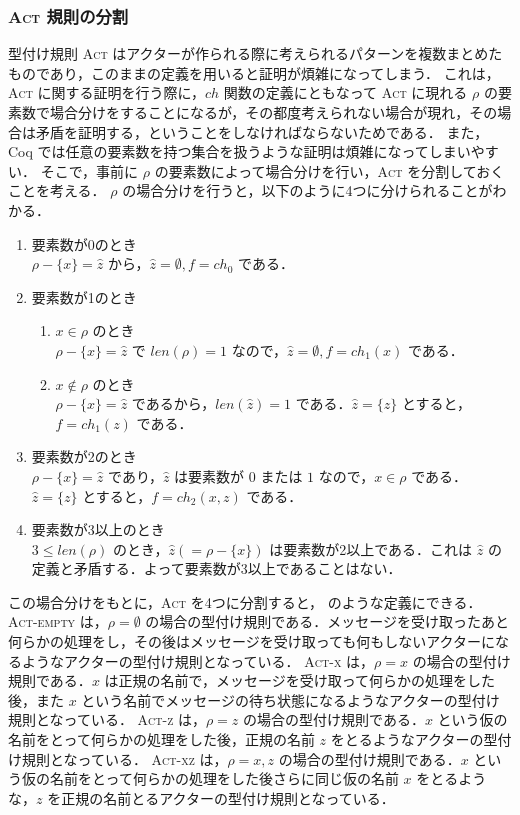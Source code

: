 \subsubsection{\textsc{Act} 規則の分割}

型付け規則 \textsc{Act} はアクターが作られる際に考えられるパターンを複数まとめたものであり，このままの定義を用いると証明が煩雑になってしまう．
これは，\textsc{Act} に関する証明を行う際に，$ch$ 関数の定義にともなって \textsc{Act} に現れる $\rho$ の要素数で場合分けをすることになるが，その都度考えられない場合が現れ，その場合は矛盾を証明する，ということをしなければならないためである．
また，Coq では任意の要素数を持つ集合を扱うような証明は煩雑になってしまいやすい．
そこで，事前に $\rho$ の要素数によって場合分けを行い，\textsc{Act} を分割しておくことを考える．
$\rho$ の場合分けを行うと，以下のように4つに分けられることがわかる．

\begin{enumerate}
  \item 要素数が0のとき \\
    $\rho - \{x\} = \hat{z}$ から，$\hat{z} = \emptyset, f = ch_0$ である．
  \item 要素数が1のとき
    \begin{enumerate}
      \item $x \in \rho$ のとき \\
        $\rho - \{x\} = \hat{z}$ で $len(\rho) = 1$ なので，$\hat{z} = \emptyset, f = ch_1(x)$ である．
      \item $x \notin \rho$ のとき \\
        $\rho - \{x\} = \hat{z}$ であるから，$len(\hat{z}) = 1$ である．$\hat{z} = \{z\}$ とすると，$f = ch_1(z)$ である．
    \end{enumerate}
  \item 要素数が2のとき \\
    $\rho - \{x\} = \hat{z}$ であり，$\hat{z}$ は要素数が $0$ または $1$ なので，$x \in \rho$ である．$\hat{z} = \{z\}$ とすると，$f = ch_2(x,z)$ である．
  \item 要素数が3以上のとき \\
    $3 \leq len(\rho)$ のとき，$\hat{z} (= \rho - \{x\})$ は要素数が2以上である．これは $\hat{z}$ の定義と矛盾する．よって要素数が3以上であることはない．
\end{enumerate}


この場合分けをもとに，\textsc{Act} を4つに分割すると， のような定義にできる．
\textsc{Act-empty} は，$\rho = \emptyset$ の場合の型付け規則である．メッセージを受け取ったあと何らかの処理をし，その後はメッセージを受け取っても何もしないアクターになるようなアクターの型付け規則となっている．
\textsc{Act-x} は，$\rho = {x}$ の場合の型付け規則である．$x$ は正規の名前で，メッセージを受け取って何らかの処理をした後，また $x$ という名前でメッセージの待ち状態になるようなアクターの型付け規則となっている．
\textsc{Act-z} は，$\rho = {z}$ の場合の型付け規則である．$x$ という仮の名前をとって何らかの処理をした後，正規の名前 $z$ をとるようなアクターの型付け規則となっている．
\textsc{Act-xz} は，$\rho = {x, z}$ の場合の型付け規則である．$x$ という仮の名前をとって何らかの処理をした後さらに同じ仮の名前 $x$ をとるような，$z$ を正規の名前とるアクターの型付け規則となっている．


